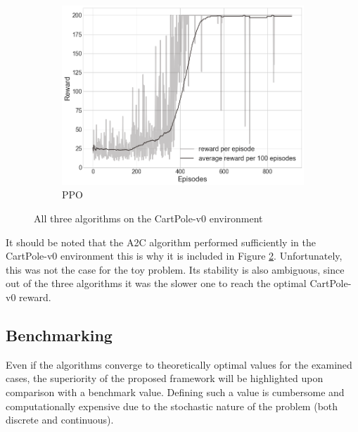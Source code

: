 \begin{figure}[H]
\begin{subfigure}[b]{0.48\textwidth}
        \includegraphics[width=\textwidth]{Figures/ppoCart.png}
        \caption{\gls{PPO}}
        \label{ppoCart}
    \end{subfigure}
    \caption{All three algorithms on the CartPole-v0 environment}
    \label{allAlgsCart}
\end{figure}

It should be noted that the \acrfull{A2C} algorithm performed sufficiently in the CartPole-v0 environment this is why it is included in Figure \ref{allAlgsCart}. Unfortunately, this was not the case for the toy problem. Its stability is also ambiguous, since out of the three algorithms it was the slower one to reach the optimal CartPole-v0 reward.

\newpage


\subsection{Benchmarking} \label{toyBenchSec}

Even if the algorithms converge to theoretically optimal values for the examined cases, the superiority of the proposed framework will be highlighted upon comparison with a benchmark value. Defining such a value is cumbersome and computationally expensive due to the stochastic nature of the problem (both discrete and continuous). \\

